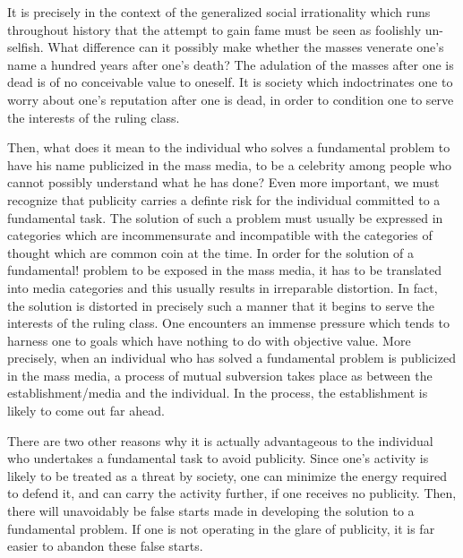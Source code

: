 \documentclass[10pt,twoside,draft]{memoir}
\begin{document}
{{{It is precisely in the context of the generalized social irrationality which 
runs throughout history that the attempt to gain fame must be seen as 
foolishly un-selfish. What difference can it possibly make whether the masses 
venerate one's name a hundred years after one's death? The adulation of the 
masses after one is dead is of no conceivable value to oneself. It is society 
which indoctrinates one to worry about one's reputation after one is dead, in 
order to condition one to serve the interests of the ruling class. 

Then, what does it mean to the individual who solves a fundamental 
problem to have his name publicized in the mass media, to be a celebrity 
among people who cannot possibly understand what he has done? Even 
more important, we must recognize that publicity carries a definte risk for 
the individual committed to a fundamental task. The solution of such a 
problem must usually be expressed in categories which are incommensurate 
and incompatible with the categories of thought which are common coin at 
the time. In order for the solution of a fundamental! problem to be exposed 
in the mass media, it has to be translated into media categories and this 
usually results in irreparable distortion. In fact, the solution is distorted in 
precisely such a manner that it begins to serve the interests of the ruling 
class. One encounters an immense pressure which tends to harness one to 
goals which have nothing to do with objective value. More precisely, when an 
individual who has solved a fundamental problem is publicized in the mass 
media, a process of mutual subversion takes place as between the 
establishment\slash media and the individual. In the process, the establishment is 
likely to come out far ahead. 

There are two other reasons why it is actually advantageous to the 
individual who undertakes a fundamental task to avoid publicity. Since one's 
activity is likely to be treated as a threat by society, one can minimize the 
energy required to defend it, and can carry the activity further, if one 
receives no publicity. Then, there will unavoidably be false starts made in 
developing the solution to a fundamental problem. If one is not operating in 
the glare of publicity, it is far easier to abandon these false starts. 

}}}
\end{document}
